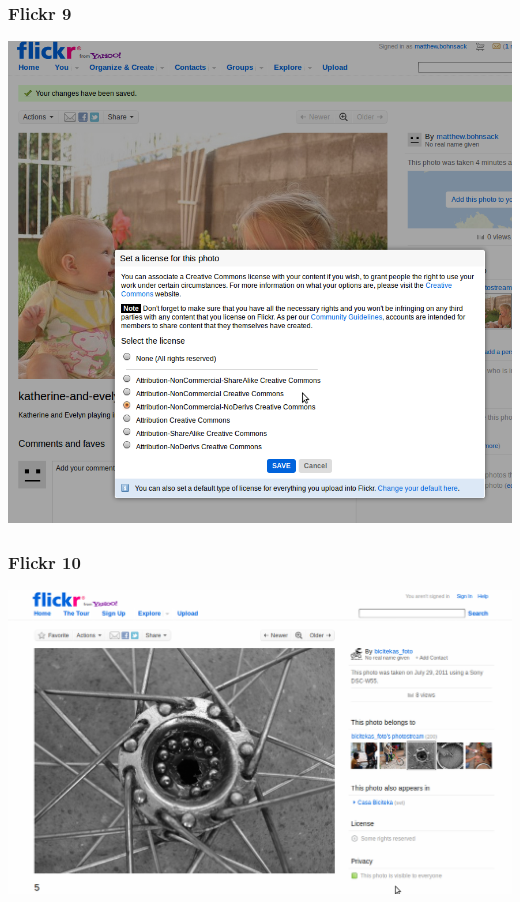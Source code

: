 \documentclass[mathserif,xcolor=dvipsnames,hyperref={bookmarks=true}]{beamer}
\begin{document}
    \begin{frame}[t]
        \frametitle{Flickr 9}
        \begin{center}
            \includegraphics[height=0.9\textheight]{set-you-license-on-flickr.png}
        \end{center}
    \end{frame}
    \begin{frame}[t]
        \frametitle{Flickr 10}
        \begin{center}
            \includegraphics[height=0.9\textheight]{view-cc-licensed-photo-on-flickr.png}
        \end{center}
    \end{frame}
\end{document}
